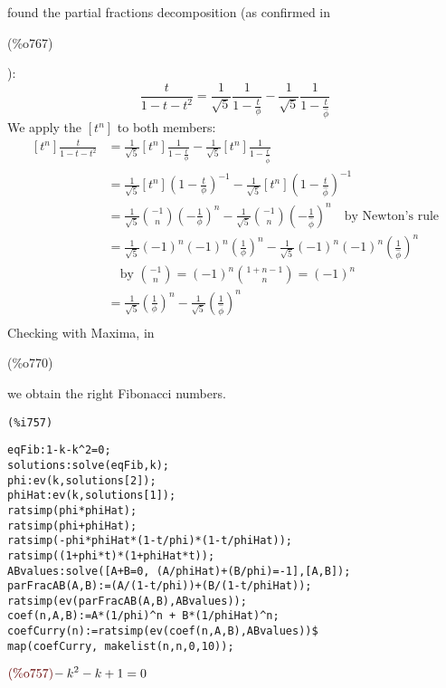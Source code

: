 found the partial fractions decomposition (as confirmed
in \parbox{8ex}{\color{labelcolor}(\%o767) }):
\begin{equation}
  \frac{t}{1-t-t^2} =  \frac{1}{\sqrt{5}}\frac{1}{1-\frac{t}{\phi}}-
  \frac{1}{\sqrt{5}}\frac{1}{1-\frac{t}{\hat{\phi}}}
\end{equation}
We apply the $[t^{n}] $ to both members:
\begin{displaymath}
  \begin{split}
    [t^{n}]\frac{t}{1-t-t^2} &=
    \frac{1}{\sqrt{5}}[t^{n}]\frac{1}{1-\frac{t}{\phi}}-
    \frac{1}{\sqrt{5}}[t^{n}]\frac{1}{1-\frac{t}{\hat{\phi}}}\\
    &= \frac{1}{\sqrt{5}}[t^{n}]\left(1-\frac{t}{\phi}\right)^{-1}-
    \frac{1}{\sqrt{5}}[t^{n}]\left(1-\frac{t}{\hat{\phi}}\right)^{-1}
    \\
    &=
    \frac{1}{\sqrt{5}}{{-1}\choose{n}}\left(-\frac{1}{\phi}\right)^{n}-
    \frac{1}{\sqrt{5}}{{-1}\choose{n}}\left(-\frac{1}{\hat{\phi}}\right)^{n}
    \quad \text{by Newton's rule}\\
    &= \frac{1}{\sqrt{5}}(-1)^n(-1)^n\left(\frac{1}{\phi}\right)^{n}-
    \frac{1}{\sqrt{5}}(-1)^n(-1)^n\left(\frac{1}{\hat{\phi}}\right)^{n}\\
    & \quad \text{by } {{-1}\choose{n}} = (-1)^n{{1+n-1}\choose{n}} =
    (-1)^n\\
    &= \frac{1}{\sqrt{5}}\left(\frac{1}{\phi}\right)^{n}-
    \frac{1}{\sqrt{5}}\left(\frac{1}{\hat{\phi}}\right)^{n}\\
  \end{split}
\end{displaymath}
Checking with Maxima, in \parbox{8ex}{\color{labelcolor}(\%o770) } we
obtain the right Fibonacci numbers.




\noindent
\begin{minipage}[t]{8ex}{\color{red}\bf
\begin{verbatim}
(%i757) 
\end{verbatim}}
\end{minipage}
\begin{minipage}[t]{\textwidth}{\color{blue}
\begin{verbatim}
eqFib:1-k-k^2=0;
solutions:solve(eqFib,k);
phi:ev(k,solutions[2]);
phiHat:ev(k,solutions[1]);
ratsimp(phi*phiHat);
ratsimp(phi+phiHat);
ratsimp(-phi*phiHat*(1-t/phi)*(1-t/phiHat));
ratsimp((1+phi*t)*(1+phiHat*t));
ABvalues:solve([A+B=0, (A/phiHat)+(B/phi)=-1],[A,B]);
parFracAB(A,B):=(A/(1-t/phi))+(B/(1-t/phiHat));
ratsimp(ev(parFracAB(A,B),ABvalues));
coef(n,A,B):=A*(1/phi)^n + B*(1/phiHat)^n;
coefCurry(n):=ratsimp(ev(coef(n,A,B),ABvalues))$
map(coefCurry, makelist(n,n,0,10));
\end{verbatim}}
\end{minipage}
\begin{math}\displaystyle
\parbox{8ex}{\color{labelcolor}(\%o757) }
-{k}^{2}-k+1=0
\end{math}

